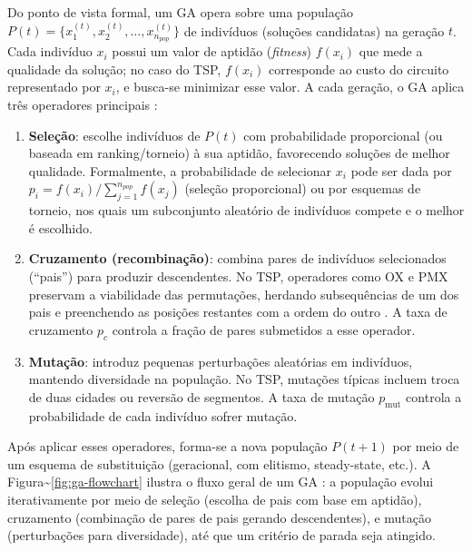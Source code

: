 Do ponto de vista formal, um GA opera sobre uma população
\(P(t) = \{x_1^{(t)}, x_2^{(t)}, \dots, x_{n_{pop}}^{(t)}\}\) de
indivíduos (soluções candidatas) na geração \(t\). Cada indivíduo
\(x_i\) possui um valor de aptidão (\emph{fitness}) \(f(x_i)\) que mede
a qualidade da solução; no caso do TSP, \(f(x_i)\) corresponde ao custo
do circuito representado por \(x_i\), e busca-se minimizar esse valor. A
cada geração, o GA aplica três operadores principais
\autocite{goldberg1989genetic,eiben2015introduction}:

\begin{enumerate}
  \def\labelenumi{\arabic{enumi}.}
  \item
        \textbf{Seleção}: escolhe indivíduos de \(P(t)\) com probabilidade
        proporcional (ou baseada em ranking/torneio) à sua aptidão,
        favorecendo soluções de melhor qualidade. Formalmente, a probabilidade
        de selecionar \(x_i\) pode ser dada por
        \(p_i = f(x_i) / \sum_{j=1}^{n_{pop}} f(x_j)\) (seleção proporcional)
        ou por esquemas de torneio, nos quais um subconjunto aleatório de
        indivíduos compete e o melhor é escolhido.
  \item
        \textbf{Cruzamento (recombinação)}: combina pares de indivíduos
        selecionados (``pais'') para produzir descendentes. No TSP, operadores
        como OX e PMX preservam a viabilidade das permutações, herdando
        subsequências de um dos pais e preenchendo as posições restantes com a
        ordem do outro \autocite{larranaga1999genetic}. A taxa de cruzamento
        \(p_c\) controla a fração de pares submetidos a esse operador.
  \item
        \textbf{Mutação}: introduz pequenas perturbações aleatórias em
        indivíduos, mantendo diversidade na população. No TSP, mutações
        típicas incluem troca de duas cidades ou reversão de segmentos. A taxa
        de mutação \(p_{\text{mut}}\) controla a probabilidade de cada
        indivíduo sofrer mutação.
\end{enumerate}

Após aplicar esses operadores, forma-se a nova população \(P(t+1)\) por
meio de um esquema de substituição (geracional, com elitismo,
steady-state, etc.). A Figura\textasciitilde{}\ref{fig:ga-flowchart}
ilustra o fluxo geral de um GA
\autocite{goldberg1989genetic,eiben2015introduction}: a população evolui
iterativamente por meio de seleção (escolha de pais com base em
aptidão), cruzamento (combinação de pares de pais gerando descendentes),
e mutação (perturbações para diversidade), até que um critério de parada
seja atingido.

